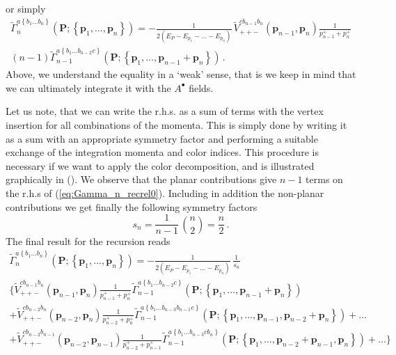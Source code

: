 \documentclass[english,american]{article}
\begin{document}
or simply
\begin{multline}
\tilde{\Gamma}_{n}^{a\left\{ b_{1}\dots b_{n}\right\} }\left(\mathbf{P};\left\{ \mathbf{p}_{1},\dots,\mathbf{p}_{n}\right\} \right)=-\frac{1}{2\left(E_{P}-E_{p_{1}}-\dots-E_{p_{n}}\right)}\,\tilde{V}_{++-}^{cb_{n-1}b_{n}}\left(\mathbf{p}_{n-1},\mathbf{p}_{n}\right)\frac{1}{p_{n-1}^{+}+p_{n}^{+}}\\
\left(n-1\right)\tilde{\Gamma}_{n-1}^{a\left\{ b_{1}\dots b_{n-2}c\right\} }\left(\mathbf{P};\left\{ \mathbf{p}_{1},\dots,\mathbf{p}_{n-1}+\mathbf{p}_{n}\right\} \right)\,.\label{eq:Gamma_n_recrel0}
\end{multline}
Above, we understand the equality in a `weak' sense, that is we keep
in mind that we can ultimately integrate it with the $A^{\bullet}$
fields.

Let us note, that we can write the r.h.s. as a sum of terms with the
vertex insertion for all combinations of the momenta. This is simply done
by writing it as a sum with  an appropriate symmetry factor and performing a
suitable exchange of the integration momenta and color indices. This procedure
is necessary if we want to  apply the color decomposition,   and is illustrated graphically in ().  We observe that the planar contributions
give $n-1$ terms on the r.h.s of (\ref{eq:Gamma_n_recrel0}). Including in addition 
the non-planar contributions we get finally the following symmetry factors
\begin{equation}
s_{n}=\frac{1}{n-1}\,\binom{n}{2}=\frac{n}{2}\,.
\end{equation}
The final result for the recursion reads
\begin{multline}
\tilde{\Gamma}_{n}^{a\left\{ b_{1}\dots b_{n}\right\} }\left(\mathbf{P};\left\{ \mathbf{p}_{1},\dots,\mathbf{p}_{n}\right\} \right)=-\frac{1}{2\left(E_{P}-E_{p_{1}}-\dots-E_{p_{n}}\right)}\,\frac{1}{s_{n}}\\
\Bigg\{\tilde{V}_{++-}^{cb_{n-1}b_{n}}\left(\mathbf{p}_{n-1},\mathbf{p}_{n}\right)\frac{1}{p_{n-1}^{+}+p_{n}^{+}}\tilde{\Gamma}_{n-1}^{a\left\{ b_{1}\dots b_{n-2}c\right\} }\left(\mathbf{P};\left\{ \mathbf{p}_{1},\dots,\mathbf{p}_{n-1}+\mathbf{p}_{n}\right\} \right)\\
+\tilde{V}_{++-}^{cb_{n-2}b_{n}}\left(\mathbf{p}_{n-2},\mathbf{p}_{n}\right)\frac{1}{p_{n-2}^{+}+p_{n}^{+}}\tilde{\Gamma}_{n-1}^{a\left\{ b_{1}\dots b_{n-3}b_{n-1}c\right\} }\left(\mathbf{P};\left\{ \mathbf{p}_{1},\dots,\mathbf{p}_{n-1},\mathbf{p}_{n-2}+\mathbf{p}_{n}\right\} \right)+\dots\\
+\tilde{V}_{++-}^{cb_{n-2}b_{n-1}}\left(\mathbf{p}_{n-2},\mathbf{p}_{n-1}\right)\frac{1}{p_{n-2}^{+}+p_{n-1}^{+}}\tilde{\Gamma}_{n-1}^{a\left\{ b_{1}\dots b_{n-3}cb_{n}\right\} }\left(\mathbf{P};\left\{ \mathbf{p}_{1},\dots,\mathbf{p}_{n-2}+\mathbf{p}_{n-1},\mathbf{p}_{n}\right\} \right)+\dots\Bigg\}\label{eq:Gamma_n_recrel}
\end{multline}
\end{document}
